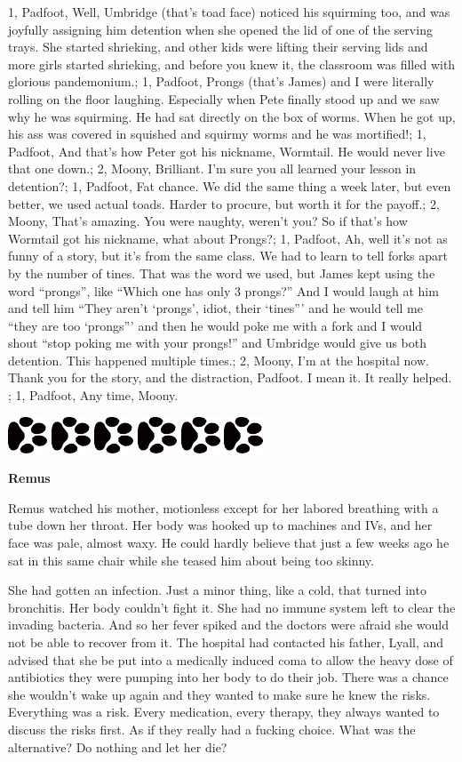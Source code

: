 \documentclass[12pt,twoside,openright]{memoir}
\newcommand\smsFrom{1}
\newcommand\smsTo{2}
\newcommand{\myrulez}{	
	\begin{center}
		\hspace{.5em}
		\includegraphics[angle=60]{dogprint.pdf}
		\hspace{.5em}
		\includegraphics[angle=120]{dogprint.pdf}
		\hspace{.5em}
		\includegraphics[angle=60]{dogprint.pdf}
		\hspace{.5em}
		\includegraphics[angle=120]{dogprint.pdf}
		\hspace{.5em}
		\includegraphics[angle=60]{dogprint.pdf}
		\hspace{.5em}
		\includegraphics[angle=120]{dogprint.pdf}
		\hspace{.5em}
	\end{center}
}
\begin{document}
{\smsFrom, {Padfoot}, {Well, Umbridge (that's toad face) noticed his squirming too, and was joyfully assigning him detention when she opened the lid of one of the serving trays. She started shrieking, and other kids were lifting their serving lids and more girls started shrieking, and before you knew it, the classroom was filled with glorious pandemonium.};
\smsFrom, {Padfoot}, {Prongs (that's James) and I were literally rolling on the floor laughing. Especially when Pete finally stood up and we saw why he was squirming. He had sat directly on the box of worms. When he got up, his ass was covered in squished and squirmy worms and he was mortified!};
\smsFrom, {Padfoot}, {And that's how Peter got his nickname, Wormtail. He would never live that one down.};
\smsTo, {Moony}, { Brilliant. I'm sure you all learned your lesson in detention?};
\smsFrom, {Padfoot}, {Fat chance. We did the same thing a week later, but even better, we used actual toads. Harder to procure, but worth it for the payoff.};
\smsTo, {Moony}, { That's amazing. You were naughty, weren't you? So if that's how Wormtail got his nickname, what about Prongs?};
\smsFrom, {Padfoot}, {Ah, well it's not as funny of a story, but it's from the same class. We had to learn to tell forks apart by the number of tines. That was the word we used, but James kept using the word ``prongs'', like ``Which one has only 3 prongs?'' And I would laugh at him and tell him ``They aren't ‘prongs', idiot, their ‘tines''' and he would tell me
``they are too ‘prongs''' and then he would poke me with a fork and I would shout ``stop poking me with your prongs!'' and Umbridge would give us both detention. This happened multiple times.};
\smsTo, {Moony}, {I'm at the hospital now. Thank you for the story, and the distraction, Padfoot. I mean it. It really helped. };
\smsFrom, {Padfoot}, {Any time, Moony.}
}
\myrulez

\textbf{Remus} 

Remus watched his mother, motionless except for her labored breathing with a tube down her throat. Her body was hooked up to machines and IVs, and her face was pale, almost waxy. He could hardly believe that just a few weeks ago he sat in this same chair while she teased him about being too skinny. 

She had gotten an infection. Just a minor thing, like a cold, that turned into bronchitis. Her body couldn't fight it. She had no immune system left to clear the invading bacteria. And so her fever spiked and the doctors were afraid she would not be able to recover from it. The hospital had contacted his father, Lyall, and advised that she be put into a medically induced coma to allow the heavy dose of antibiotics they were pumping into her body to do their job. There was a chance she wouldn't wake up again and they wanted to make sure he knew the risks. Everything was a risk. Every medication, every therapy, they always wanted to discuss the risks first. As if they really had a fucking choice. What was the alternative? Do nothing and let her die?
\end{document}
